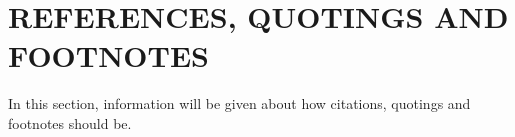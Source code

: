 \chapter{REFERENCES, QUOTINGS AND FOOTNOTES}\label{Ch4}

In this section, information will be given about how citations, quotings and footnotes should be.







